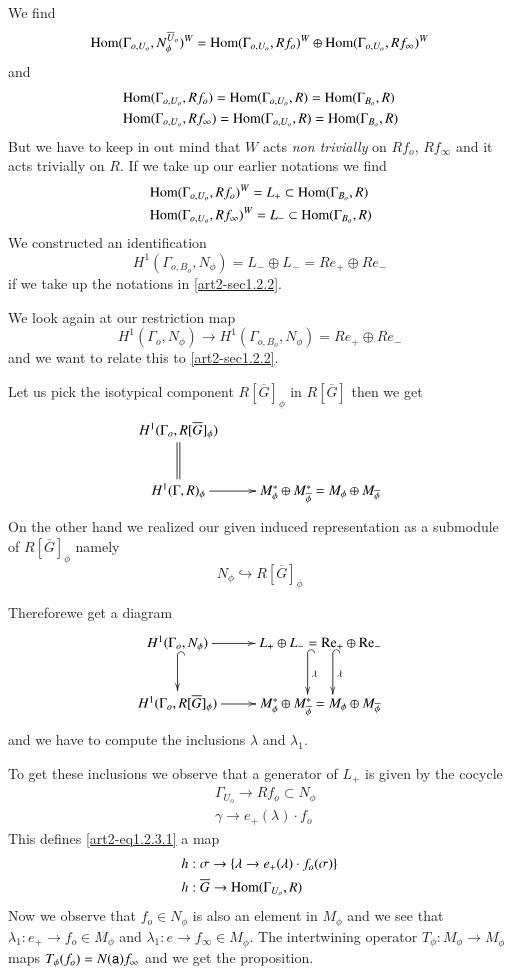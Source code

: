 We find
$$
\operatorname{Hom} (\Gamma_{o,U_{o}},N^{\overline{U}_{o}}_{\phi})^{W}=\operatorname{Hom}(\Gamma_{o,U_{o}},Rf_{o})^{W}\oplus \operatorname{Hom}(\Gamma_{o,U_{o}},Rf_{\infty})^{W}
$$
and
\begin{align*}
&\operatorname{Hom}(\Gamma_{o,U_{o}},Rf_{o})=\operatorname{Hom}(\Gamma_{o,U_{o}},R)=\operatorname{Hom}(\Gamma_{B_{o}},R)\\
&\operatorname{Hom}(\Gamma_{o,U_{o}},Rf_{\infty})=\operatorname{Hom}(\Gamma_{o,U_{o}},R)=\operatorname{Hom}(\Gamma_{B_{o}},R)
\end{align*}
But we have to keep in out mind that $W$ acts {\em non trivially} on $Rf_{o}$, $Rf_{\infty}$ and it acts trivially on $R$. If we take up our earlier notations we find
\begin{align*}
&\operatorname{Hom}(\Gamma_{o,U_{o}},Rf_{o})^{W}=L_{+}\subset \operatorname{Hom}(\Gamma_{B_{o}},R)\\
&\operatorname{Hom}(\Gamma_{o,U_{o}},Rf_{\infty})^{W}=L_{-}\subset \operatorname{Hom}(\Gamma_{B_{o}},R)
\end{align*}
We constructed an identification
$$
H^{1}(\Gamma_{o,B_{o}},N_{\phi})=L_{-}\oplus L_{-}=Re_{+}\oplus Re_{-}
$$
if we take up the notations in \ref{art2-sec1.2.2}.

We look again at our restriction map
$$
H^{1}(\Gamma_{o},N_{\phi})\to H^{1}(\Gamma_{o,B_{o}},N_{\phi})=Re_{+}\oplus Re_{-}
$$
and we want to relate this to \ref{art2-sec1.2.2}.

Let us pick the isotypical component $R[\overline{G}]_{\phi}$ in $R[\overline{G}]$ then we get
$$
\xymatrix{
H^{1}(\Gamma_{o},R[\overline{G}]_{\phi})\ar@{=}[d] &\\
H^{1}(\Gamma,R)_{\phi}\ar[r] & M^{*}_{\phi}\oplus M^{*}_{\overline{\phi}}=M_{\phi}\oplus M_{\overline{\phi}}
}
$$
On the other hand we realized our given induced representation as a submodule of $R[\overline{G}]_{\phi}$ namely
$$
N_{\phi}\hookrightarrow R[\overline{G}]_{\phi}
$$

Therefore\pageoriginale we get a diagram
\[
\xymatrix{
H^{1}(\Gamma_{o},N_{\phi})\ar[r]\ar@{^(->}[d] & L_{+}\oplus L_{-}=\rRe_{+}\oplus\rRe_{-}\ar@<2ex>@{^(->}[d]^{\lambda}\ar@<-2ex>@{^(->}[d]^{\lambda}\\
H^{1}(\Gamma_{o},R[\overline{G}]_{\phi})\ar[r] & M^{*}_{\phi}\oplus M^{*}_{\overline{\phi}}=M_{\phi}\oplus M_{\overline{\phi}}
}
\]
and we have to compute the inclusions $\lambda$ and $\lambda_{1}$.

To get these inclusions we observe that a generator of $L_{+}$ is given by the cocycle
\begin{align*}
& \Gamma_{U_{o}}\to Rf_{o}\subset N_{\phi}\\
& \gamma\to e_{+}(\lambda)\cdot f_{o}
\end{align*}
This defines \eqref{art2-eq1.2.3.1} a map
\begin{align*}
& h:\sigma \to \{\lambda\to e_{+}(\lambda)\cdot f_{o}(\sigma)\}\\
& h:\overline{G}\to \operatorname{Hom}(\Gamma_{U_{o}},R)
\end{align*}
Now we observe that $f_{o}\in N_{\phi}$ is also an element in $M_{\phi}$ and we see that $\lambda_{1}:e_{+}\to f_{o}\in M_{\phi}$ and $\lambda_{1}:e\to f_{\infty}\in M_{\overline{\phi}}$. The intertwining operator $T_{\phi}:M_{\phi}\to M_{\overline{\phi}}$ maps $T_{\phi}(f_{o})=N(\mathsf{a})f_{\infty}$ and we get the proposition.


